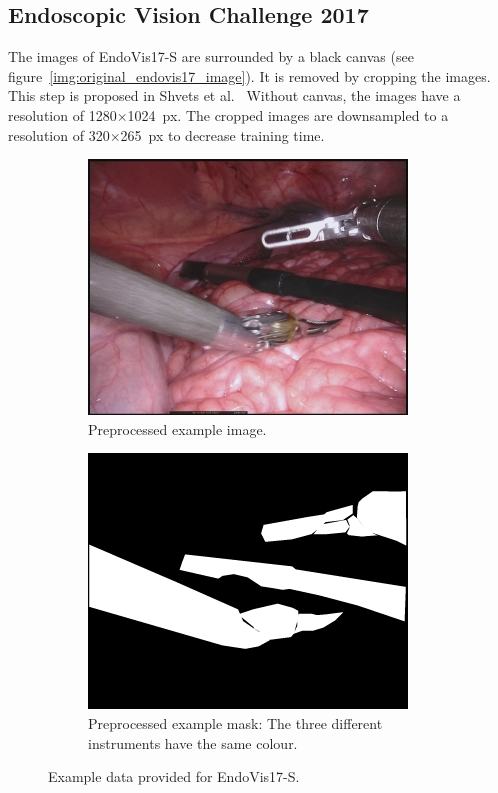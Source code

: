 \subsection{Endoscopic Vision Challenge 2017}
\label{sec:preprocess_endovis17}
The images of EndoVis17-S are surrounded by a black canvas (see figure~\ref{img:original_endovis17_image}). It is removed by cropping the images. This step is proposed in Shvets et al.~\cite{Shvets2018}
Without canvas, the images have a resolution of 1280$\times$1024~px.
The cropped images are downsampled to a resolution of 320$\times$265~px to decrease training time. 

\begin{figure}
\centering
\begin{subfigure}[t]{0.49\textwidth}
	\centering
	\includegraphics[width=.7\textwidth]{images/dataset/robotic17_segm/frame009_3instr_preprocessed.jpg}
	\caption{Preprocessed example image.}
	\label{img:preprocessed_train_img_segm17}
\end{subfigure}
\begin{subfigure}[t]{0.49\textwidth}
	\centering
	\includegraphics[width=.7\textwidth]{images/dataset/robotic17_segm/merged_dataset1_maryland_frame009.png}
	\caption{Preprocessed example mask: The three different instruments have the same colour.}
	\label{img:preprocessed_mask_segm17}
\end{subfigure}
\caption[Example data EndoVis17-S]{Example data provided for EndoVis17-S.}
\label{img:example}
\end{figure}

